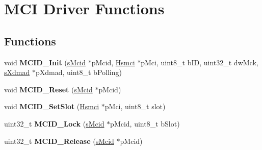 \hypertarget{group__mcid__functions}{}\section{M\+CI Driver Functions}
\label{group__mcid__functions}
\subsection*{Functions}
\begin{DoxyCompactItemize}
\item 
\mbox{\label{group__mcid__functions_gacddd87e745fbdbff2826b44c188b867f}} 
void {\bfseries M\+C\+I\+D\+\_\+\+Init} (\mbox{\hyperlink{group__mcid__structs_ga4c4fb535b1abc784ad83425b7a10f576}{s\+Mcid}} $\ast$p\+Mcid, \mbox{\hyperlink{structHsmci}{Hsmci}} $\ast$p\+Mci, uint8\+\_\+t b\+ID, uint32\+\_\+t dw\+Mck, \mbox{\hyperlink{group__dmad__structs_gaf2c13151514615a6beb35c0d868a5053}{s\+Xdmad}} $\ast$p\+Xdmad, uint8\+\_\+t b\+Polling)
\item 
\mbox{\label{group__mcid__functions_ga03c7b7af1b4abf00f759b0a47c476baf}} 
void {\bfseries M\+C\+I\+D\+\_\+\+Reset} (\mbox{\hyperlink{group__mcid__structs_ga4c4fb535b1abc784ad83425b7a10f576}{s\+Mcid}} $\ast$p\+Mcid)
\item 
\mbox{\label{group__mcid__functions_gaac22cefb141ea222a6f86527fe00ec7f}} 
void {\bfseries M\+C\+I\+D\+\_\+\+Set\+Slot} (\mbox{\hyperlink{structHsmci}{Hsmci}} $\ast$p\+Mci, uint8\+\_\+t slot)
\item 
\mbox{\label{group__mcid__functions_ga166b9dbbc64963a05679dc4a71ebe1b0}} 
uint32\+\_\+t {\bfseries M\+C\+I\+D\+\_\+\+Lock} (\mbox{\hyperlink{group__mcid__structs_ga4c4fb535b1abc784ad83425b7a10f576}{s\+Mcid}} $\ast$p\+Mcid, uint8\+\_\+t b\+Slot)
\item 
\mbox{\label{group__mcid__functions_ga9920930e7ebcc4f1eaacdb0156f3f752}} 
uint32\+\_\+t {\bfseries M\+C\+I\+D\+\_\+\+Release} (\mbox{\hyperlink{group__mcid__structs_ga4c4fb535b1abc784ad83425b7a10f576}{s\+Mcid}} $\ast$p\+Mcid)
\item 
\mbox{\label{group__mcid__functions_ga8b24d6b7cbfd7240dc23dbd4c6759975}} 

\end{DoxyCompactItemize}
